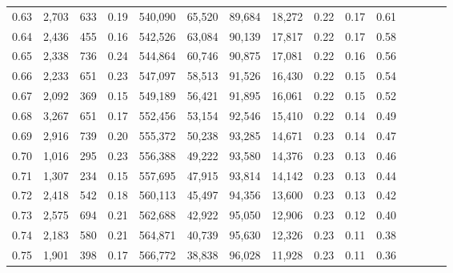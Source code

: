 \begin{tabular}{rrrcrrrrrrrrrrr}
0.63 &   2,703 &    633 &                                       0.19 &  540,090 &   65,520 &   89,684 &   18,272 &  0.22 &  0.17 &                         0.61 \\
0.64 &   2,436 &    455 &                                       0.16 &  542,526 &   63,084 &   90,139 &   17,817 &  0.22 &  0.17 &                         0.58 \\
0.65 &   2,338 &    736 &                                       0.24 &  544,864 &   60,746 &   90,875 &   17,081 &  0.22 &  0.16 &                         0.56 \\
0.66 &   2,233 &    651 &                                       0.23 &  547,097 &   58,513 &   91,526 &   16,430 &  0.22 &  0.15 &                         0.54 \\
0.67 &   2,092 &    369 &                                       0.15 &  549,189 &   56,421 &   91,895 &   16,061 &  0.22 &  0.15 &                         0.52 \\
0.68 &   3,267 &    651 &                                       0.17 &  552,456 &   53,154 &   92,546 &   15,410 &  0.22 &  0.14 &                         0.49 \\
0.69 &   2,916 &    739 &                                       0.20 &  555,372 &   50,238 &   93,285 &   14,671 &  0.23 &  0.14 &                         0.47 \\
0.70 &   1,016 &    295 &                                       0.23 &  556,388 &   49,222 &   93,580 &   14,376 &  0.23 &  0.13 &                         0.46 \\
0.71 &   1,307 &    234 &                                       0.15 &  557,695 &   47,915 &   93,814 &   14,142 &  0.23 &  0.13 &                         0.44 \\
0.72 &   2,418 &    542 &                                       0.18 &  560,113 &   45,497 &   94,356 &   13,600 &  0.23 &  0.13 &                         0.42 \\
0.73 &   2,575 &    694 &                                       0.21 &  562,688 &   42,922 &   95,050 &   12,906 &  0.23 &  0.12 &                         0.40 \\
0.74 &   2,183 &    580 &                                       0.21 &  564,871 &   40,739 &   95,630 &   12,326 &  0.23 &  0.11 &                         0.38 \\
0.75 &   1,901 &    398 &                                       0.17 &  566,772 &   38,838 &   96,028 &   11,928 &  0.23 &  0.11 &                         0.36 \\

\end{tabular}
